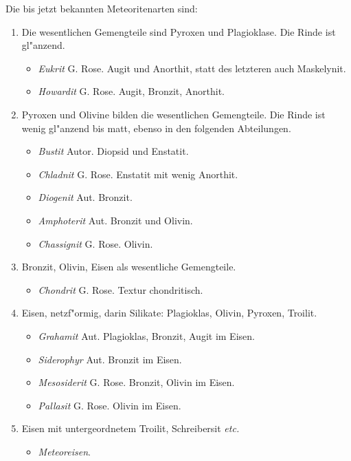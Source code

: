 \documentclass[a4paper, 11pt, oneside, polutonikogreek, german]{article}
\begin{document}
Die bis jetzt bekannten Meteoritenarten sind:
\begin{enumerate}
    \item Die wesentlichen Gemengteile sind Pyroxen und Plagioklase. Die Rinde ist gl"anzend.
    \begin{itemize}
        \item \emph{Eukrit} G. Rose. Augit und Anorthit, statt des letzteren auch Maskelynit.
        \item \emph{Howardit} G. Rose. Augit, Bronzit, Anorthit.
    \end{itemize}
    \item Pyroxen und Olivine bilden die wesentlichen Gemengteile. Die Rinde ist wenig gl"anzend bis matt, ebenso in den folgenden Abteilungen.
    \begin{itemize}
        \item \emph{Bustit} Autor. Diopsid und Enstatit.
        \item \emph{Chladnit} G. Rose. Enstatit mit wenig Anorthit.
        \item \emph{Diogenit} Aut. Bronzit.
        \item \emph{Amphoterit} Aut. Bronzit und Olivin.        
        \item \emph{Chassignit} G. Rose. Olivin.
    \end{itemize}
    \item Bronzit, Olivin, Eisen als wesentliche Gemengteile.
    \begin{itemize}
        \item \emph{Chondrit} G. Rose. Textur chondritisch.
    \end{itemize}
    \item Eisen, netzf"ormig, darin Silikate: Plagioklas, Olivin, Pyroxen, Troilit.
    \begin{itemize}
        \item \emph{Grahamit} Aut. Plagioklas, Bronzit, Augit im Eisen.
        \item \emph{Siderophyr} Aut. Bronzit im Eisen.
        \item \emph{Mesosiderit} G. Rose. Bronzit, Olivin im Eisen.
        \item \emph{Pallasit} G. Rose. Olivin im Eisen.
    \end{itemize}
    \item Eisen mit untergeordnetem Troilit, Schreibersit \emph{etc.}
    \begin{itemize}
        \item \emph{Meteoreisen}.
    \end{itemize}
\end{enumerate}
\end{document}
